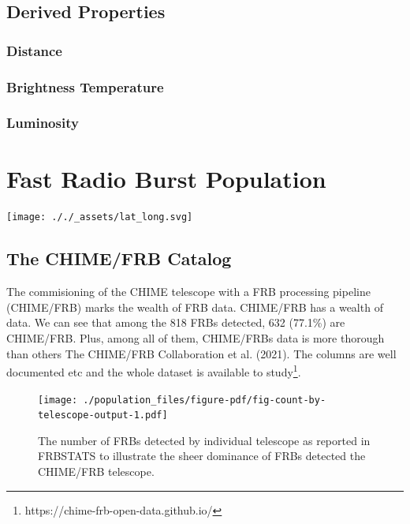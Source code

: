 \documentclass[
  letterpaper,
  DIV=11,
  numbers=noendperiod]{scrreport}
\begin{document}
\hypertarget{derived-properties}{%
\section{Derived Properties}\label{derived-properties}}

\hypertarget{distance}{%
\subsection{Distance}\label{distance}}

\hypertarget{brightness-temperature}{%
\subsection{Brightness Temperature}\label{brightness-temperature}}

\hypertarget{luminosity}{%
\subsection{Luminosity}\label{luminosity}}


\hypertarget{fast-radio-burst-population}{%
\chapter{Fast Radio Burst
Population}\label{fast-radio-burst-population}}

\texttt{[image: ././\_assets/lat\_long.svg]}

\hypertarget{the-chimefrb-catalog}{%
\section{The CHIME/FRB Catalog}\label{the-chimefrb-catalog}}

The commisioning of the CHIME telescope with a FRB processing pipeline
(CHIME/FRB) marks the wealth of FRB data. CHIME/FRB has a wealth of
data. We can see that among the 818 FRBs detected, 632 (77.1\%) are
CHIME/FRB. Plus, among all of them, CHIME/FRBs data is more thorough
than others The CHIME/FRB Collaboration et al. (2021). The columns are
well documented etc and the whole dataset is available to
study\footnote{https://chime-frb-open-data.github.io/}.

\begin{figure}

{\centering \texttt{[image: ./population\_files/figure-pdf/fig-count-by-telescope-output-1.pdf]}

}

\caption[\label{fig-count-by-telescope}The number of FRBs detected by
individual telescope as reported in FRBSTATS
to illustrate the sheer dominance of FRBs detected the CHIME/FRB
telescope.]{\label{fig-count-by-telescope}The number of FRBs detected by
individual telescope as reported in FRBSTATS\footnotemark{}
to illustrate the sheer dominance of FRBs detected the CHIME/FRB
telescope.}

\end{figure}
\end{document}
